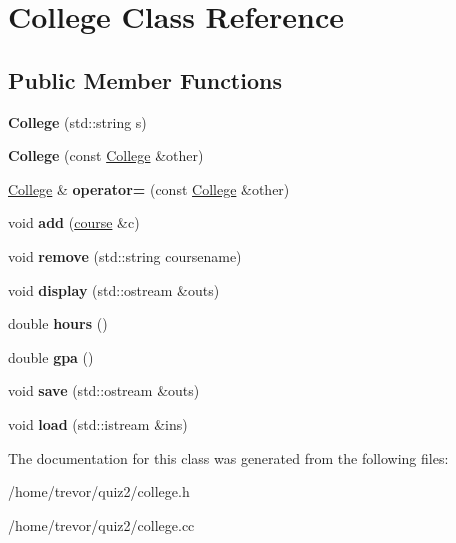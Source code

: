 \hypertarget{class_college}{}\section{College Class Reference}
\label{class_college}
\subsection*{Public Member Functions}
\begin{DoxyCompactItemize}
\item 
{\bfseries College} (std\+::string s)\hypertarget{class_college_adabaf4087355e83f9f7d39f1e1498b41}{}\label{class_college_adabaf4087355e83f9f7d39f1e1498b41}

\item 
{\bfseries College} (const \hyperlink{class_college}{College} \&other)\hypertarget{class_college_ad007ad488e5a7ef986114080d0c8e101}{}\label{class_college_ad007ad488e5a7ef986114080d0c8e101}

\item 
\hyperlink{class_college}{College} \& {\bfseries operator=} (const \hyperlink{class_college}{College} \&other)\hypertarget{class_college_af2194c9b37f80d13dc3fdba6784b18e8}{}\label{class_college_af2194c9b37f80d13dc3fdba6784b18e8}

\item 
void {\bfseries add} (\hyperlink{classcourse}{course} \&c)\hypertarget{class_college_a67fd1d8970b46b24ce2e0dd72598a22f}{}\label{class_college_a67fd1d8970b46b24ce2e0dd72598a22f}

\item 
void {\bfseries remove} (std\+::string coursename)\hypertarget{class_college_a4d2ae513b36e6421fb1ca2c08459cfe6}{}\label{class_college_a4d2ae513b36e6421fb1ca2c08459cfe6}

\item 
void {\bfseries display} (std\+::ostream \&outs)\hypertarget{class_college_a52ca0a164483cf5c05591cd0fb8b300c}{}\label{class_college_a52ca0a164483cf5c05591cd0fb8b300c}

\item 
double {\bfseries hours} ()\hypertarget{class_college_a8a7a762611a1d7e00c453390d49355fd}{}\label{class_college_a8a7a762611a1d7e00c453390d49355fd}

\item 
double {\bfseries gpa} ()\hypertarget{class_college_aaf9bfaa0bc717e96da6365661a96fcd0}{}\label{class_college_aaf9bfaa0bc717e96da6365661a96fcd0}

\item 
void {\bfseries save} (std\+::ostream \&outs)\hypertarget{class_college_af6b419f813bc990c0e11f99b78a26899}{}\label{class_college_af6b419f813bc990c0e11f99b78a26899}

\item 
void {\bfseries load} (std\+::istream \&ins)\hypertarget{class_college_a11422094ddd907705daede7aa537dd73}{}\label{class_college_a11422094ddd907705daede7aa537dd73}

\end{DoxyCompactItemize}


The documentation for this class was generated from the following files\+:\begin{DoxyCompactItemize}
\item 
/home/trevor/quiz2/college.\+h\item 
/home/trevor/quiz2/college.\+cc\end{DoxyCompactItemize}
